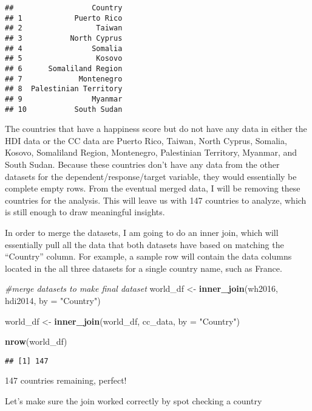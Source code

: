 \documentclass[]{article}
\newenvironment{Shaded}{\begin{snugshade}}{\end{snugshade}}
\newcommand{\CommentTok}[1]{\textcolor[rgb]{0.56,0.35,0.01}{\textit{#1}}}
\newcommand{\DataTypeTok}[1]{\textcolor[rgb]{0.13,0.29,0.53}{#1}}
\newcommand{\KeywordTok}[1]{\textcolor[rgb]{0.13,0.29,0.53}{\textbf{#1}}}
\newcommand{\NormalTok}[1]{#1}
\newcommand{\OperatorTok}[1]{\textcolor[rgb]{0.81,0.36,0.00}{\textbf{#1}}}
\newcommand{\StringTok}[1]{\textcolor[rgb]{0.31,0.60,0.02}{#1}}
\begin{document}
\begin{verbatim}
##                  Country
## 1            Puerto Rico
## 2                 Taiwan
## 3           North Cyprus
## 4                Somalia
## 5                 Kosovo
## 6      Somaliland Region
## 7             Montenegro
## 8  Palestinian Territory
## 9                Myanmar
## 10           South Sudan
\end{verbatim}

The countries that have a happiness score but do not have any data in
either the HDI data or the CC data are Puerto Rico, Taiwan, North
Cyprus, Somalia, Kosovo, Somaliland Region, Montenegro, Palestinian
Territory, Myanmar, and South Sudan. Because these countries don't have
any data from the other datasets for the dependent/response/target
variable, they would essentially be complete empty rows. From the
eventual merged data, I will be removing these countries for the
analysis. This will leave us with 147 countries to analyze, which is
still enough to draw meaningful insights.

In order to merge the datasets, I am going to do an inner join, which
will essentially pull all the data that both datasets have based on
matching the ``Country'' column. For example, a sample row will contain
the data columns located in the all three datasets for a single country
name, such as France.

\begin{Shaded}
\begin{Highlighting}[]
\CommentTok{#merge datasets to make final dataset}
\NormalTok{world_df <-}\StringTok{ }\KeywordTok{inner_join}\NormalTok{(wh2016, hdi2014, }\DataTypeTok{by =} \StringTok{"Country"}\NormalTok{)}

\NormalTok{world_df <-}\StringTok{ }\KeywordTok{inner_join}\NormalTok{(world_df, cc_data, }\DataTypeTok{by =} \StringTok{"Country"}\NormalTok{)}

\KeywordTok{nrow}\NormalTok{(world_df)}
\end{Highlighting}
\end{Shaded}

\begin{verbatim}
## [1] 147
\end{verbatim}

147 countries remaining, perfect!

Let's make sure the join worked correctly by spot checking a country

\begin{Shaded}
\end{Shaded}
\end{document}
